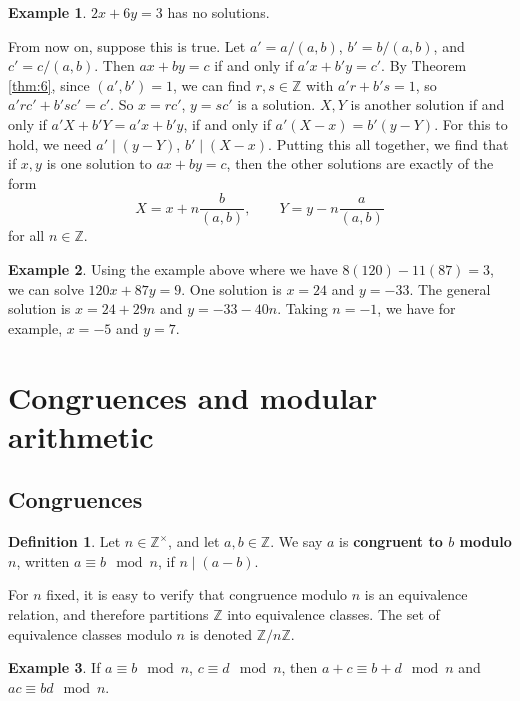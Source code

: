 \documentclass{article}
\newcommand{\Z}{\mathbb{Z}}
\newcommand{\rb}[1]{\left( #1 \right)}
\theoremstyle{definition}\newtheorem{definition}{Definition}
\theoremstyle{definition}\newtheorem{remark}[definition]{Remark}
\theoremstyle{definition}\newtheorem*{example}{Example}
\theoremstyle{definition}\newtheorem*{note}{Note}
\begin{document}
\begin{example}
$ 2x + 6y = 3 $ has no solutions.
\end{example}

From now on, suppose this is true. Let $ a' = a / \rb{a, b} $, $ b' = b / \rb{a, b} $, and $ c' = c / \rb{a, b} $. Then $ ax + by = c $ if and only if $ a'x + b'y = c' $. By Theorem \ref{thm:6}, since $ \rb{a', b'} = 1 $, we can find $ r, s \in \Z $ with $ a'r + b's = 1 $, so $ a'rc' + b'sc' = c' $. So $ x = rc' $, $ y = sc' $ is a solution. $ X, Y $ is another solution if and only if $ a'X + b'Y = a'x + b'y $, if and only if $ a'\rb{X - x} = b'\rb{y - Y} $. For this to hold, we need $ a' \mid \rb{y - Y} $, $ b' \mid \rb{X - x} $. Putting this all together, we find that if $ x, y $ is one solution to $ ax + by = c $, then the other solutions are exactly of the form
$$ X = x + n\dfrac{b}{\rb{a, b}}, \qquad Y = y - n\dfrac{a}{\rb{a, b}} $$
for all $ n \in \Z $.

\begin{example}
Using the example above where we have $ 8\rb{120} - 11\rb{87} = 3 $, we can solve $ 120x + 87y = 9 $. One solution is $ x = 24 $ and $ y = -33 $. The general solution is $ x = 24 + 29n $ and $ y = -33 - 40n $. Taking $ n = -1 $, we have for example, $ x = -5 $ and $ y = 7 $.
\end{example}

\section{Congruences and modular arithmetic}

\subsection{Congruences}

\begin{definition}
Let $ n \in \Z^\times $, and let $ a, b \in \Z $. We say $ a $ is \textbf{congruent to $ b $ modulo $ n $}, written $ a \equiv b \mod n $, if $ n \mid \rb{a - b} $.
\end{definition}

For $ n $ fixed, it is easy to verify that congruence modulo $ n $ is an equivalence relation, and therefore partitions $ \Z $ into equivalence classes. The set of equivalence classes modulo $ n $ is denoted $ \Z / n\Z $.

\begin{example}
If $ a \equiv b \mod n $, $ c \equiv d \mod n $, then $ a + c \equiv b + d \mod n $ and $ ac \equiv bd \mod n $.
\end{example}
\end{document}
